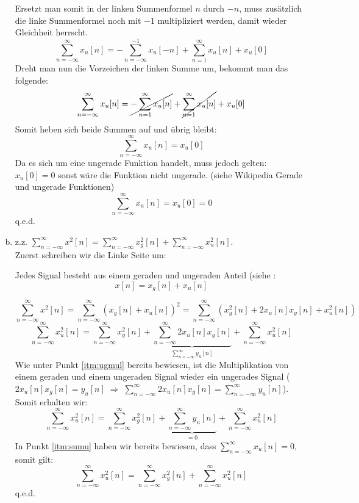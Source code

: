 \begin{uebsp}
\begin{Answer}
\begin{enumerate}[a)]
            Ersetzt man somit in der linken Summenformel $n$ durch $-n$, muss zusätzlich die linke Summenformel noch mit $-1$ multipliziert werden, damit wieder Gleichheit herrscht.
            \[\sum_{n=-\infty}^\infty x_u[n]=-\sum_{n=-\infty}^{-1} x_u[-n]+\sum_{n=1}^\infty x_u[n]+x_u[0]\]
            Dreht man nun die Vorzeichen der linken Summe um, bekommt man das folgende:
            \[\sum_{n=-\infty}^\infty x_u[n]=\cancel{-\sum_{n=1}^{\infty} x_u[n]}+\cancel{\sum_{n=1}^\infty x_u[n]}+x_u[0]\]
            Somit heben sich beide Summen auf und übrig bleibt:
            \[\sum_{n=-\infty}^\infty x_u[n]=x_u[0]\]
            Da es sich um eine ungerade Funktion handelt, muss jedoch gelten: $x_u[0]=0$ sonst wäre die Funktion nicht ungerade. (siehe Wikipedia Gerade und ungerade Funktionen)
            \[\sum_{n=-\infty}^\infty x_u[n]=x_u[0]=0\]
            q.e.d.
            \item z.z. $\sum_{n=-\infty}^\infty x^2[n]=\sum_{n=-\infty}^\infty x_g^2[n]+\sum_{n=-\infty}^\infty x_u^2[n].$\\
                Zuerst schreiben wir die Linke Seite um:
                \begin{uebsp_theory}
                    Jedes Signal besteht aus einem geraden und ungeraden Anteil (siehe :
                    \[x[n]=x_g[n]+x_u[n]\]
                \end{uebsp_theory}
                \[\sum_{n=-\infty}^\infty x^2[n]=\sum_{n=-\infty}^\infty(x_g[n]+x_u[n])^2=\sum_{n=-\infty}^\infty(x_g^2[n]+2x_u[n]x_g[n]+x_u^2[n])\]
                \[\sum_{n=-\infty}^\infty x_u^2[n]=\sum_{n=-\infty}^\infty x_g^2[n]+\underbrace{\sum_{n=-\infty}^\infty 2x_u[n]x_g[n]}_{\sum_{n=-\infty}^\infty y_u[n]}+\sum_{n=-\infty}^\infty x_u^2[n]\]
                Wie unter Punkt \ref{itm:ugmul} bereits bewiesen, ist die Multiplikation von einem geraden und einem ungeraden Signal wieder ein ungerades Signal ($2x_u[n]x_g[n]=y_u[n]\;\Rightarrow\;\sum_{n=-\infty}^\infty 2x_u[n]x_g[n]=\sum_{n=-\infty}^\infty y_u[n]$). Somit erhalten wir:
                \[\sum_{n=-\infty}^\infty x_u^2[n]=\sum_{n=-\infty}^\infty x_g^2[n]+\underbrace{\sum_{n=-\infty}^\infty y_u[n]}_{=0}+\sum_{n=-\infty}^\infty x_u^2[n]\]
            In Punkt \ref{itm:sumu} haben wir bereits bewiesen, dass $\sum_{n=-\infty}^\infty x_u[n]=0$, somit gilt:
                \[\sum_{n=-\infty}^\infty x_u^2[n]=\sum_{n=-\infty}^\infty x_g^2[n]+\sum_{n=-\infty}^\infty x_u^2[n]\]
                q.e.d.
        \end{enumerate}
    \end{Answer}
\end{uebsp}
